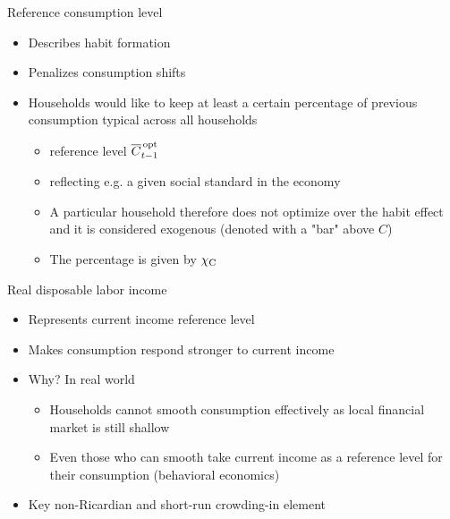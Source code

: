 
 \begin{frame}{Reference consumption level}
   \vspace{-5mm}
   \begin{itemize}
     \item Describes habit formation
     \item Penalizes consumption shifts 
     \item Households would like to keep at least a certain percentage of previous consumption typical across all households
     \begin{itemize}
      \item reference level $\overline{C}^{\, \text{opt}}_{t-1}$
      \item reflecting e.g. a given social standard in the economy
      \item A particular household therefore does not optimize over the habit effect and it is considered exogenous (denoted with a "bar" above $C$)
      \item The percentage is given by $\chi_\cc$
     \end{itemize}
   \end{itemize} 
 
 \end{frame}
 
 
 \startframecont
 
 \begin{frame}{Real disposable labor income}
   \begin{itemize}
     \item Represents current income reference level
     \item Makes consumption respond stronger to current income
     \item Why? In real world
     \begin{itemize}
       \item Households cannot smooth consumption effectively as local financial market is still shallow
       \item Even those who can smooth take current income as a reference level for their consumption (behavioral economics)
     \end{itemize}
     \item Key non-Ricardian and short-run crowding-in element
  \end{itemize} 
 \end{frame}
 
